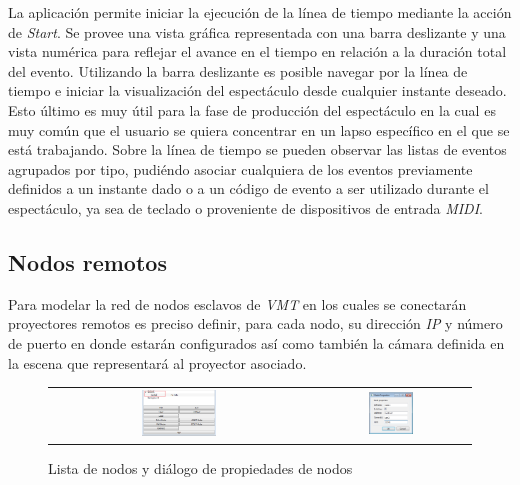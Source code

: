 La aplicación permite iniciar la ejecución de la línea de tiempo mediante la acción de \emph{Start}. Se provee una vista gráfica representada con una barra deslizante y una vista numérica para reflejar el avance en el tiempo en relación a la duración total del evento.
Utilizando la barra deslizante es posible navegar por la línea de tiempo e iniciar la visualización del espectáculo desde cualquier instante deseado. Esto último es muy útil para la fase de producción del espectáculo en la cual es muy común que el usuario se quiera concentrar en un lapso específico en el que se está trabajando.
Sobre la línea de tiempo se pueden observar las listas de eventos agrupados por tipo, pudiéndo asociar cualquiera de los eventos previamente definidos a un instante dado o a un código de evento a ser utilizado durante el espectáculo, ya sea de teclado o proveniente de dispositivos de entrada \emph{MIDI}.

\subsection{Nodos remotos}

Para modelar la red de nodos esclavos de \emph{VMT} en los cuales se conectarán proyectores remotos es preciso definir, para cada nodo, su dirección \emph{IP} y número de puerto en donde estarán configurados así como también la cámara definida en la escena que representará al proyector asociado.

\begin{figure}
	\begin{center}
		\begin{tabular}[c]{cc}
			\includegraphics[width=0.3\textwidth]{./Cap5_vmt/vmt_nodeProperties_1.png}
				&        
			\includegraphics[width=0.3\textwidth]{./Cap5_vmt/vmt_nodeProperties_2.png}
		\end{tabular}
	\end{center}
	\caption{Lista de nodos y diálogo de propiedades de nodos}
	\label{fig:VMT-Nodes}
\end{figure}

